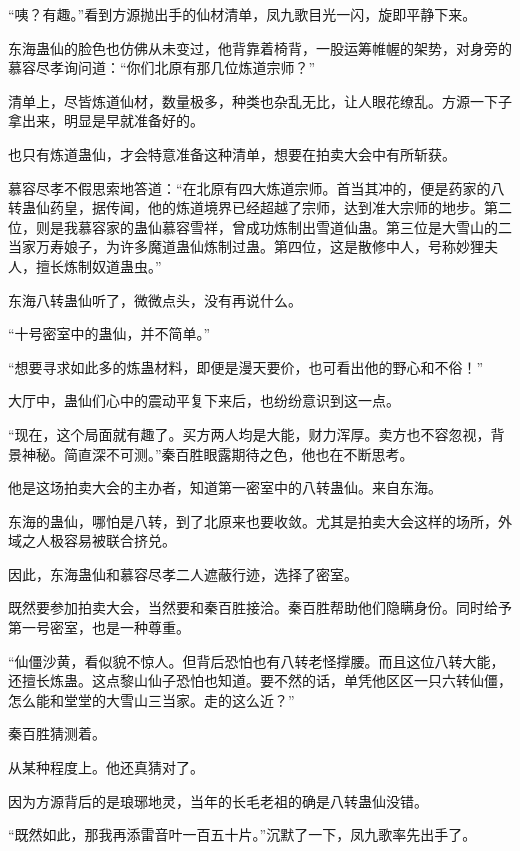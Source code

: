 
\begin{this_body}

“咦？有趣。”看到方源抛出手的仙材清单，凤九歌目光一闪，旋即平静下来。

东海蛊仙的脸色也仿佛从未变过，他背靠着椅背，一股运筹帷幄的架势，对身旁的慕容尽孝询问道：“你们北原有那几位炼道宗师？”

清单上，尽皆炼道仙材，数量极多，种类也杂乱无比，让人眼花缭乱。方源一下子拿出来，明显是早就准备好的。

也只有炼道蛊仙，才会特意准备这种清单，想要在拍卖大会中有所斩获。

慕容尽孝不假思索地答道：“在北原有四大炼道宗师。首当其冲的，便是药家的八转蛊仙药皇，据传闻，他的炼道境界已经超越了宗师，达到准大宗师的地步。第二位，则是我慕容家的蛊仙慕容雪祥，曾成功炼制出雪道仙蛊。第三位是大雪山的二当家万寿娘子，为许多魔道蛊仙炼制过蛊。第四位，这是散修中人，号称妙狸夫人，擅长炼制奴道蛊虫。”

东海八转蛊仙听了，微微点头，没有再说什么。

“十号密室中的蛊仙，并不简单。”

“想要寻求如此多的炼蛊材料，即便是漫天要价，也可看出他的野心和不俗！”

大厅中，蛊仙们心中的震动平复下来后，也纷纷意识到这一点。

“现在，这个局面就有趣了。买方两人均是大能，财力浑厚。卖方也不容忽视，背景神秘。简直深不可测。”秦百胜眼露期待之色，他也在不断思考。

他是这场拍卖大会的主办者，知道第一密室中的八转蛊仙。来自东海。

东海的蛊仙，哪怕是八转，到了北原来也要收敛。尤其是拍卖大会这样的场所，外域之人极容易被联合挤兑。

因此，东海蛊仙和慕容尽孝二人遮蔽行迹，选择了密室。

既然要参加拍卖大会，当然要和秦百胜接洽。秦百胜帮助他们隐瞒身份。同时给予第一号密室，也是一种尊重。

“仙僵沙黄，看似貌不惊人。但背后恐怕也有八转老怪撑腰。而且这位八转大能，还擅长炼蛊。这点黎山仙子恐怕也知道。要不然的话，单凭他区区一只六转仙僵，怎么能和堂堂的大雪山三当家。走的这么近？”

秦百胜猜测着。

从某种程度上。他还真猜对了。

因为方源背后的是琅琊地灵，当年的长毛老祖的确是八转蛊仙没错。

“既然如此，那我再添雷音叶一百五十片。”沉默了一下，凤九歌率先出手了。


\end{this_body}
